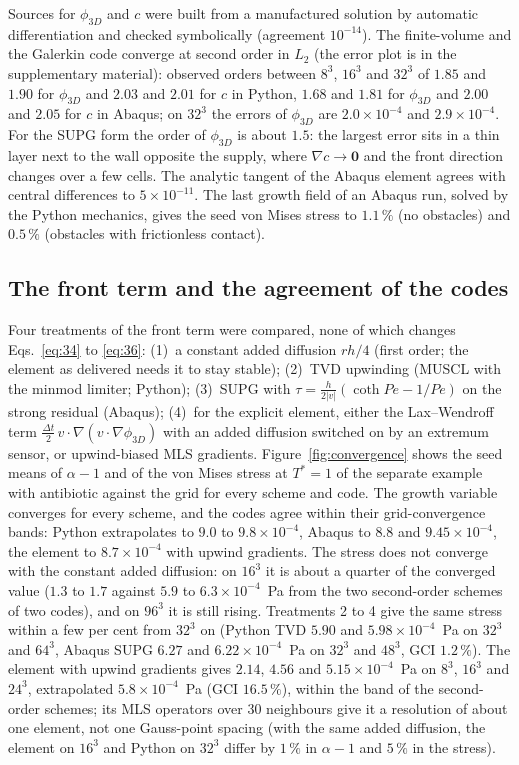 \documentclass[11pt,a4paper]{article}
\newcommand{\phiD}{\phi_{3D}}
\begin{document}
Sources for $\phiD$ and $c$ were built from a manufactured solution \citep{Roache2002MMS} by automatic differentiation and checked symbolically (agreement $10^{-14}$). The finite-volume and the Galerkin code converge at second order in $L_2$ (the error plot is in the supplementary material): observed orders between $8^3$, $16^3$ and $32^3$ of $1.85$ and $1.90$ for $\phiD$ and $2.03$ and $2.01$ for $c$ in Python, $1.68$ and $1.81$ for $\phiD$ and $2.00$ and $2.05$ for $c$ in Abaqus; on $32^3$ the errors of $\phiD$ are $2.0\times10^{-4}$ and $2.9\times10^{-4}$. For the SUPG form the order of $\phiD$ is about $1.5$: the largest error sits in a thin layer next to the wall opposite the supply, where $\nabla c\to\mathbf 0$ and the front direction changes over a few cells. The analytic tangent of the Abaqus element agrees with central differences to $5\times10^{-11}$. The last growth field of an Abaqus run, solved by the Python mechanics, gives the seed von Mises stress to $1.1\,\%$ (no obstacles) and $0.5\,\%$ (obstacles with frictionless contact).

\subsection{The front term and the agreement of the codes}
\label{app:front}

Four treatments of the front term were compared, none of which changes Eqs.~\eqref{eq:34} to \eqref{eq:36}: (1)~a constant added diffusion $r h/4$ (first order; the element as delivered needs it to stay stable); (2)~TVD upwinding (MUSCL with the minmod limiter; Python); (3)~SUPG with $\tau=\tfrac{h}{2|v|}(\coth Pe-1/Pe)$ on the strong residual (Abaqus); (4)~for the explicit element, either the Lax--Wendroff term $\tfrac{\Delta t}{2}\,v\cdot\nabla(v\cdot\nabla\phiD)$ with an added diffusion switched on by an extremum sensor, or upwind-biased MLS gradients. Figure~\ref{fig:convergence} shows the seed means of $\alpha-1$ and of the von Mises stress at $T^*=1$ of the separate example with antibiotic against the grid for every scheme and code. The growth variable converges for every scheme, and the codes agree within their grid-convergence bands: Python extrapolates to $9.0$ to $9.8\times10^{-4}$, Abaqus to $8.8$ and $9.45\times10^{-4}$, the element to $8.7\times10^{-4}$ with upwind gradients. The stress does not converge with the constant added diffusion: on $16^3$ it is about a quarter of the converged value ($1.3$ to $1.7$ against $5.9$ to $6.3\times10^{-4}$~Pa from the two second-order schemes of two codes), and on $96^3$ it is still rising. Treatments 2 to 4 give the same stress within a few per cent from $32^3$ on (Python TVD $5.90$ and $5.98\times10^{-4}$~Pa on $32^3$ and $64^3$, Abaqus SUPG $6.27$ and $6.22\times10^{-4}$~Pa on $32^3$ and $48^3$, GCI $1.2\,\%$). The element with upwind gradients gives $2.14$, $4.56$ and $5.15\times10^{-4}$~Pa on $8^3$, $16^3$ and $24^3$, extrapolated $5.8\times10^{-4}$~Pa (GCI $16.5\,\%$), within the band of the second-order schemes; its MLS operators over 30 neighbours give it a resolution of about one element, not one Gauss-point spacing (with the same added diffusion, the element on $16^3$ and Python on $32^3$ differ by $1\,\%$ in $\alpha-1$ and $5\,\%$ in the stress).
\end{document}
